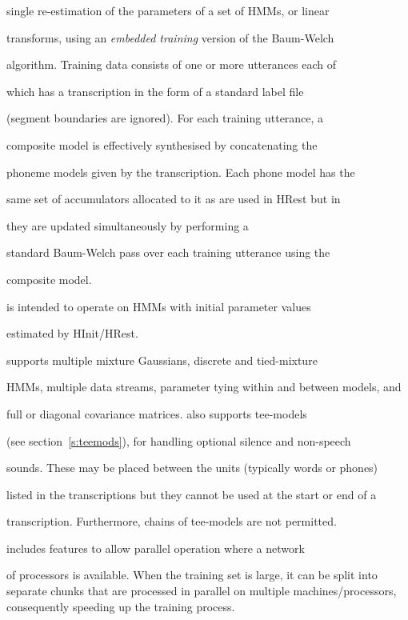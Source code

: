 single re-estimation of the parameters of a set of HMMs, or linear


transforms, using an {\em embedded training} version of the Baum-Welch


algorithm.  Training data consists of one or more utterances each of


which has a transcription in the form of a standard label file


(segment boundaries are ignored).  For each training utterance, a


composite model is effectively synthesised by concatenating the


phoneme models given by the transcription.  Each phone model has the


same set of accumulators allocated to it as are used in HRest but in


 they are updated simultaneously by performing a


standard Baum-Welch pass over each training utterance using the


composite model.


  


 is intended to operate on HMMs with initial parameter values 


estimated by HInit/HRest.


 supports multiple mixture Gaussians, discrete and tied-mixture


HMMs, multiple data streams, parameter tying within and between models, and


full or diagonal covariance matrices.  also supports tee-models


(see section~\ref{s:teemods}), for handling optional silence and non-speech


sounds. These may be placed between the units (typically words or phones)


listed in the transcriptions but they cannot be used at the start or end of a


transcription. Furthermore, chains of tee-models are not permitted.





 includes features to allow parallel operation where a network


of processors is available. When the training set is large, it can be split into separate chunks that are processed in parallel on multiple machines/processors, consequently speeding up the training process. 






